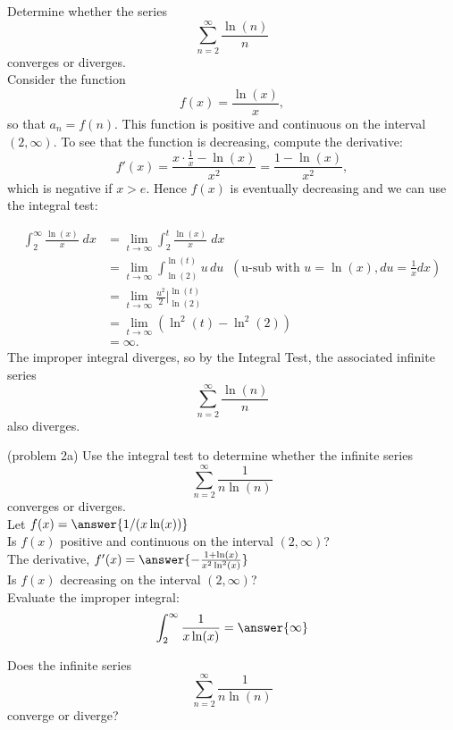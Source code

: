\documentclass{ximera}
\begin{document}
\begin{example}[example 2]
Determine whether the series
\[
\sum_{n=2}^\infty \frac{\ln(n)}{n}
\]
converges or diverges.\\
Consider the function
\[
f(x) = \frac{\ln(x)}{x},
\]
so that $a_n = f(n)$.
This function is positive and continuous on the interval $(2, \infty)$.
To see that the function is decreasing, compute the derivative:
\[
f'(x) = \frac{x\cdot\frac{1}{x}- \ln(x)}{x^2} = \frac{1-\ln(x)}{x^2},
\]
which is negative if $x > e$. Hence $f(x)$ is eventually decreasing and we can use the integral test:

\begin{align*}
\int_2^\infty \frac{\ln(x)}{x} \; dx &= \lim_{t \to \infty} \int_2^t \frac{\ln(x)}{x} \; dx\\
&= \lim_{t \to \infty} \int_{\ln(2)}^{\ln(t)} u \, du \;\; \left(\text{u-sub with $u = \ln(x), du = \frac{1}{x} dx$}\right)\\
&= \lim_{t \to \infty} \frac{u^2}{2} \bigg|_{\ln(2)}^{\ln(t)}\\
&= \lim_{t \to \infty} \left(\ln^2(t) - \ln^2(2) \right)\\
&= \infty.
\end{align*}
The improper integral diverges, so by the Integral Test, the associated infinite series
\[
\sum_{n=2}^\infty \frac{\ln(n)}{n}
\]
also diverges.
\end{example}



\begin{problem}(problem 2a)
Use the integral test to determine whether the infinite series
\[
\sum_{n=2}^\infty \frac{1}{n\ln(n)}
\]
converges or diverges.\\

Let $f(x) = \answer{1/(x\ln(x))}$\\

Is $f(x)$ positive and continuous on the interval $(2, \infty)$?
\\ %

The derivative, $f'(x) = \answer{-\frac{1+\ln(x)}{x^2 \ln^2(x)}}$\\

Is $f(x)$ decreasing on the interval $(2, \infty)$? \\

Evaluate the improper integral: 
\[
 \int_2^\infty \frac{1}{x\ln(x)} = \answer{\infty}
\]

Does the infinite series
\[
\sum_{n=2}^\infty \frac{1}{n\ln(n)}
\]
converge or diverge? 


\end{problem}
\end{document}
